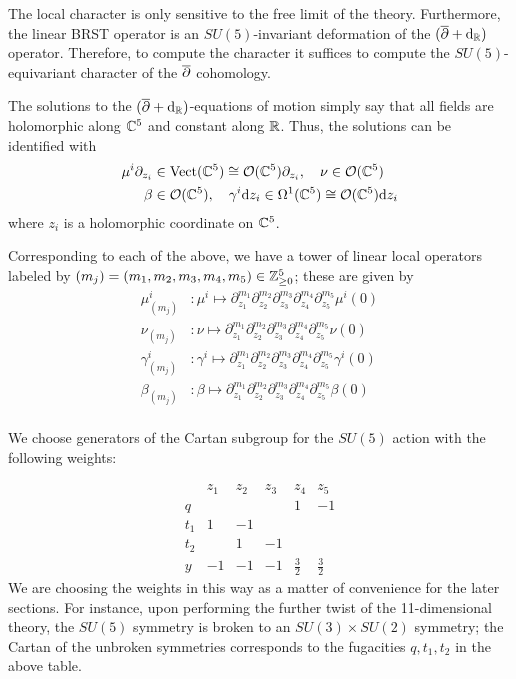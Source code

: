 The local character is only sensitive to the free limit of the theory.
Furthermore, the linear BRST operator is an $SU(5)$-invariant deformation of the $(\overline{\partial} + {\rm d}_{\mathbb R})$ operator. 
Therefore, to compute the character it suffices to compute the $SU(5)$-equivariant character of the $\overline{\partial}$ cohomology. 

The solutions to the $(\overline{\partial} + {\rm d}_{\mathbb R})$-equations of motion simply say that all fields are holomorphic along $\mathbb C^5$ and constant along $\mathbb R$. 
Thus, the solutions can be identified with 
\begin{align*}
\mu^{i}\partial_{z_i} & \in {\rm Vect}(\mathbb C^5) \cong \mathcal O(\mathbb{C}^5)\partial_{z_i},\quad 
\nu \in \mathcal O (\mathbb{C}^5) \\
\beta & \in \mathcal O (\mathbb{C}^5), \quad \gamma^{i} {\rm d} z_i \in \Omega^{1}(\mathbb C^5) \cong \mathcal O (\mathbb{C}^5){\rm d} z_i 
\end{align*}
where $z_i$ is a holomorphic coordinate on $\mathbb C^5$. 

Corresponding to each of the above, we have a tower of linear local operators labeled by $(m_j) = (m_1, m_2, m_3, m_4, m_5)\in \mathbb{Z}^5_{\geq 0}$; these are given by
\begin{align*}
 \mu^{i}_{(m_j)} &: \mu^{i}\mapsto \partial_{z_1}^{m_1}\partial_{z_2}^{m_2}\partial_{z_3}^{m_3}\partial_{z_4}^{m_4}\partial_{z_5}^{m_5}\mu^{i} (0) \\
\nu_{(m_j)} &: \nu\mapsto \partial_{z_1}^{m_1}\partial_{z_2}^{m_2}\partial_{z_3}^{m_3}\partial_{z_4}^{m_4}\partial_{z_5}^{m_5}\nu (0) \\
\gamma^{i}_{(m_j)} &: \gamma^{i}\mapsto \partial_{z_1}^{m_1}\partial_{z_2}^{m_2}\partial_{z_3}^{m_3}\partial_{z_4}^{m_4}\partial_{z_5}^{m_5}\gamma^{i} (0) \\
 \beta_{(m_j)} &: \beta\mapsto \partial_{z_1}^{m_1}\partial_{z_2}^{m_2}\partial_{z_3}^{m_3}\partial_{z_4}^{m_4}\partial_{z_5}^{m_5}\beta (0) \\
\end{align*}

\iffalse
We choose generators of the Cartan subgroup for the $SU(5)$ action with the following weights:

\[\begin{array}{|c|c|c|c|c|c|}
& z_1 & z_2 & z_3 & z_4 & z_5 \\
\hline
q & & & & 1 & -1 \\
t_1 & 1 & -1 & & & \\
t_2 & & 1 & -1 & & \\
y & -1 & -1 & -1 &\frac 3 2 & \frac 3 2
\end{array}\]
We are choosing the weights in this way as a matter of convenience for the later sections. 
For instance, upon performing the further twist of the 11-dimensional theory, the $SU(5)$ symmetry is broken to an $SU(3)\times SU(2)$ symmetry; the Cartan of the unbroken symmetries corresponds to the fugacities $q, t_1, t_2$ in the above table. 

